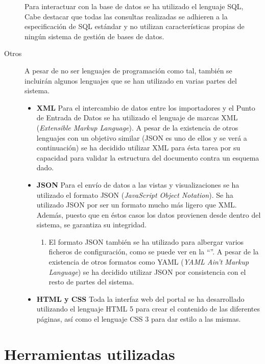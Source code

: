 \begin{description}
		Para interactuar con la base de datos se ha utilizado el lenguaje SQL, Cabe destacar que todas las consultas realizadas se adhieren a la especificación de SQL estándar y no utilizan características propias de ningún sistema de gestión de bases de datos.
	\item[Otros]
		A pesar de no ser lenguajes de programación como tal, también se incluirán algunos lenguajes que se han utilizado en varias partes del sistema.
		\begin{itemize}
			\item \textbf{XML}
				Para el intercambio de datos entre los importadores y el Punto de Entrada de Datos se ha utilizado el lenguaje de marcas XML (\textit{Extensible Markup Language}).  A pesar de la existencia de otros lenguajes con un objetivo similar (JSON es uno de ellos y se verá a continuación) se ha decidido utilizar XML para ésta tarea por su capacidad para validar la estructura del documento contra un esquema dado.
			\item \textbf{JSON}
				Para el envío de datos a las vistas y visualizaciones se ha utilizado el formato JSON (\textit{JavaScript Object Notation}).  Se ha utilizado JSON por ser un formato mucho más ligero que XML.  Además, puesto que en éstos casos los datos provienen desde dentro del sistema, se garantiza su integridad.
					\begin{enumerate}
						\item
							El formato JSON también se ha utilizado para albergar varios ficheros de configuración, como se puede ver en la ``''.  A pesar de la existencia de otros formatos como YAML (\textit{YAML Ain't Markup Language}) se ha decidido utilizar JSON por consistencia con el resto de partes del sistema.
				\end{enumerate}
			\item \textbf{HTML y CSS}
				Toda la interfaz web del portal se ha desarrollado utilizando el lenguaje HTML 5 para crear el contenido de las diferentes páginas, así como el lenguaje CSS 3 para dar estilo a las mismas.
		\end{itemize}
\end{description}


\section{Herramientas utilizadas}
\label{implementacion:herramientas_utilizadas}

